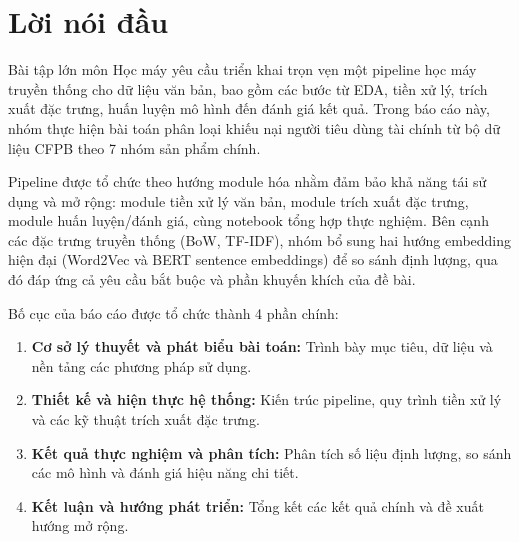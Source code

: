 \documentclass[a4paper,12pt]{article}
\begin{document}
\thispagestyle{empty}
\newpage
\tableofcontents
\thispagestyle{empty}
\newpage
\listoffigures
{}
\thispagestyle{empty}
\newpage
\listoftables
{}
\thispagestyle{empty}
\newpage
{}
\setcounter{page}{1}

\section*{Lời nói đầu}

Bài tập lớn môn Học máy yêu cầu triển khai trọn vẹn một pipeline học máy truyền thống cho dữ liệu văn bản, bao gồm các bước từ EDA, tiền xử lý, trích xuất đặc trưng, huấn luyện mô hình đến đánh giá kết quả. Trong báo cáo này, nhóm thực hiện bài toán phân loại khiếu nại người tiêu dùng tài chính từ bộ dữ liệu CFPB theo 7 nhóm sản phẩm chính.

Pipeline được tổ chức theo hướng module hóa nhằm đảm bảo khả năng tái sử dụng và mở rộng: module tiền xử lý văn bản, module trích xuất đặc trưng, module huấn luyện/đánh giá, cùng notebook tổng hợp thực nghiệm. Bên cạnh các đặc trưng truyền thống (BoW, TF-IDF), nhóm bổ sung hai hướng embedding hiện đại (Word2Vec và BERT sentence embeddings) để so sánh định lượng, qua đó đáp ứng cả yêu cầu bắt buộc và phần khuyến khích của đề bài.

Bố cục của báo cáo được tổ chức thành 4 phần chính:
\begin{enumerate}[nosep]
    \item \textbf{Cơ sở lý thuyết và phát biểu bài toán:} Trình bày mục tiêu, dữ liệu và nền tảng các phương pháp sử dụng.
    \item \textbf{Thiết kế và hiện thực hệ thống:} Kiến trúc pipeline, quy trình tiền xử lý và các kỹ thuật trích xuất đặc trưng.
    \item \textbf{Kết quả thực nghiệm và phân tích:} Phân tích số liệu định lượng, so sánh các mô hình và đánh giá hiệu năng chi tiết.
    \item \textbf{Kết luận và hướng phát triển:} Tổng kết các kết quả chính và đề xuất hướng mở rộng.
\end{enumerate}

\newpage

\newpage

\newpage

\newpage

\newpage



\end{document}
